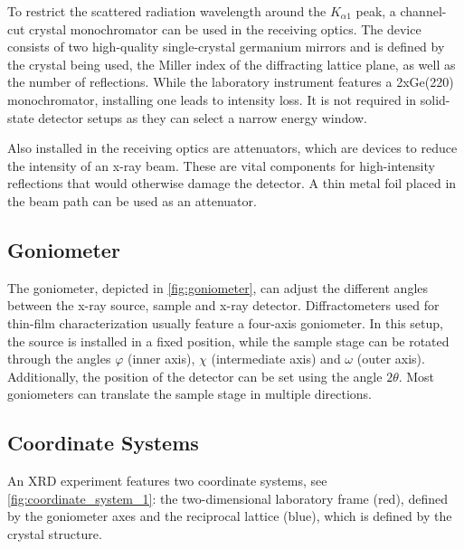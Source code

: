 To restrict the scattered radiation wavelength around the $K_{\alpha 1}$ peak, a channel-cut
crystal monochromator can be used in the receiving optics. The device consists
of two high-quality single-crystal germanium mirrors and is defined by the
crystal being used, the Miller index of the diffracting lattice plane, as well
as the number of reflections. While the laboratory instrument features a 2xGe(220)
monochromator, installing one leads to intensity loss. It is not required in
solid-state detector setups as they can select a narrow energy window.

Also installed in the receiving optics are attenuators, which are devices to reduce
the intensity of an x-ray beam. These are vital components for high-intensity
reflections that would otherwise damage the detector. A thin metal foil placed in
the beam path can be used as an attenuator.

\subsection{Goniometer}

The goniometer, depicted in \cref{fig:goniometer}, can adjust the different
angles between the x-ray source, sample and x-ray detector. Diffractometers used for
thin-film characterization usually feature a four-axis goniometer. In this setup,
the source is installed in a fixed position, while the sample stage can be rotated
through the angles $\varphi$ (inner axis), $\chi$ (intermediate axis) and
$\omega$ (outer axis). Additionally, the position of the detector can be
set using the angle $2\theta$. Most goniometers can translate the sample stage in
multiple directions.

\subsection{Coordinate Systems}
\label{sec:coordinate_systems}

An XRD experiment features two coordinate systems, see \cref{fig:coordinate_system_1}:
the two-dimensional laboratory frame (red), defined by the goniometer axes and the
reciprocal lattice (blue), which is defined by the crystal structure.

